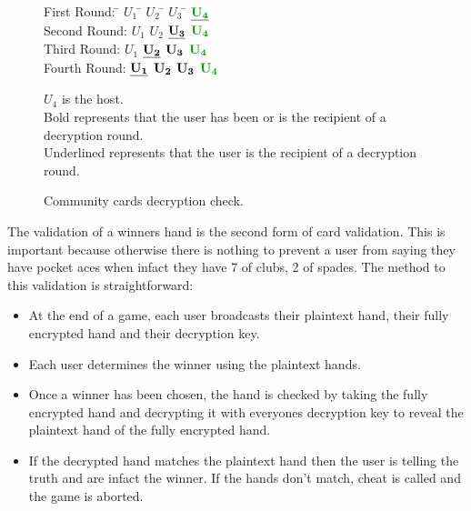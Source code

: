 \documentclass[11pt, oneside]{article}   	%
\begin{document}
\begin{figure}[H]
\caption{Community cards decryption check.}
\vspace{0.1cm} 
\begin{framed}

\begin{tabbing}
First Round:		\hspace{2.5cm} \=  $U_1$ \hspace{1cm}\= $U_2$ \hspace{1cm}\= $U_3$ \hspace{1cm}\= $\underline{{\bf \color{dkgreen}U_4}}$\\
Second Round: 	\> $U_1$ \> $U_2$ \> $\underline{\bf U_3}$ \> ${\bf \color{dkgreen}U_4}$\\
Third Round:		\>$U_1$ \> $\underline{\bf U_2}$ \>${\bf U_3}$ \>${\bf \color{dkgreen}U_4}$\\
Fourth Round:		\>$\underline{\bf U_1}$ \>${\bf U_2}$ \>${\bf U_3}$ \>${\bf \color{dkgreen}U_4}$\\
\end{tabbing}

{\bf \color{dkgreen}$U_4$} is the host.\\
Bold represents that the user has been or is the recipient of a decryption round.\\
Underlined represents that the user is the recipient of a decryption round.
\vspace{0.1cm} 
\end{framed}
\vspace{-0.45cm} 
\label{fig:com}
\end{figure}

The validation of a winners hand is the second form of card validation. This is important because otherwise there is nothing to prevent a user from saying they have pocket aces when infact they have 7 of clubs, 2 of spades. The method to this validation is straightforward:

\begin{itemize}
\renewcommand{\labelitemi}{$\bullet$}
\item At the end of a game, each user broadcasts their plaintext hand, their fully encrypted hand and their decryption key.
\item Each user determines the winner using the plaintext hands.
\item Once a winner has been chosen, the hand is checked by taking the fully encrypted hand and decrypting it with everyones decryption key to reveal the plaintext hand of the fully encrypted hand.
\item If the decrypted hand matches the plaintext hand then the user is telling the truth and are infact the winner. If the hands don’t match, cheat is called and the game is aborted.
\end{itemize}
\end{document}
